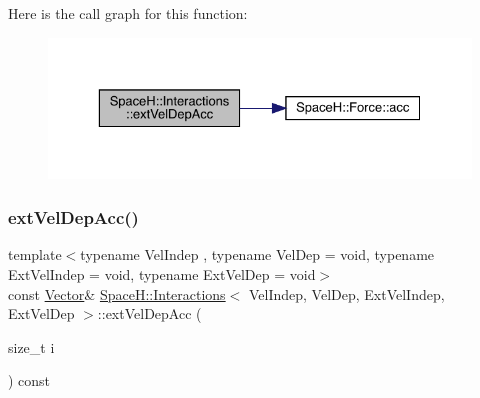 Here is the call graph for this function\+:
\nopagebreak
\begin{figure}[H]
\begin{center}
\leavevmode
\includegraphics[width=329pt]{class_space_h_1_1_interactions_a0513d1e434ad7c7eefeb57d1cd8f45f8_cgraph}
\end{center}
\end{figure}
\mbox{\label{class_space_h_1_1_interactions_a9718af3e96323a7141f0c11e0d86b138}} 
\subsubsection{\texorpdfstring{ext\+Vel\+Dep\+Acc()}{extVelDepAcc()}\hspace{0.1cm}{\footnotesize\ttfamily [2/2]}}
{\footnotesize\ttfamily template$<$typename Vel\+Indep , typename Vel\+Dep  = void, typename Ext\+Vel\+Indep  = void, typename Ext\+Vel\+Dep  = void$>$ \\
const \mbox{\hyperlink{class_space_h_1_1_interactions_aaebe228fb44635e85cdb8cc9c10d30d1}{Vector}}\& \mbox{\hyperlink{class_space_h_1_1_interactions}{Space\+H\+::\+Interactions}}$<$ Vel\+Indep, Vel\+Dep, Ext\+Vel\+Indep, Ext\+Vel\+Dep $>$\+::ext\+Vel\+Dep\+Acc (\begin{DoxyParamCaption}\item[{size\+\_\+t}]{i }\end{DoxyParamCaption}) const\hspace{0.3cm}{\ttfamily [inline]}}

